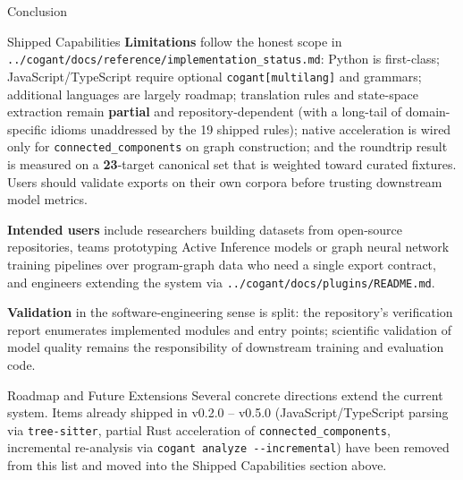 \documentclass[
  ignorenonframetext,
]{beamer}
\begin{document}
\begin{frame}[fragile]{Conclusion}
\begin{block}{Shipped Capabilities}
\textbf{Limitations} follow the honest scope in
\texttt{../cogant/docs/reference/implementation\_status.md}: Python is
first-class; JavaScript/TypeScript require optional
\texttt{cogant{[}multilang{]}} and grammars; additional languages are
largely roadmap; translation rules and state-space extraction remain
\textbf{partial} and repository-dependent (with a long-tail of
domain-specific idioms unaddressed by the 19 shipped rules); native
acceleration is wired only for \texttt{connected\_components} on graph
construction; and the roundtrip result is measured on a
\textbf{23}-target canonical set that is weighted toward curated
fixtures. Users should validate exports on their own corpora before
trusting downstream model metrics.

\textbf{Intended users} include researchers building datasets from
open-source repositories, teams prototyping Active Inference models or
graph neural network training pipelines over program-graph data who need
a single export contract, and engineers extending the system via
\texttt{../cogant/docs/plugins/README.md}.

\textbf{Validation} in the software-engineering sense is split: the
repository's verification report enumerates implemented modules and
entry points; scientific validation of model quality remains the
responsibility of downstream training and evaluation code.
\end{block}

\begin{block}{Roadmap and Future Extensions}
\protect{}\label{roadmap-and-future-extensions}
Several concrete directions extend the current system. Items already
shipped in v0.2.0 -- v0.5.0 (JavaScript/TypeScript parsing via
\texttt{tree-sitter}, partial Rust acceleration of
\texttt{connected\_components}, incremental re-analysis via
\texttt{cogant\ analyze\ -\/-incremental}) have been removed from this
list and moved into the Shipped Capabilities section above.


\end{block}
\end{frame}
\end{document}
